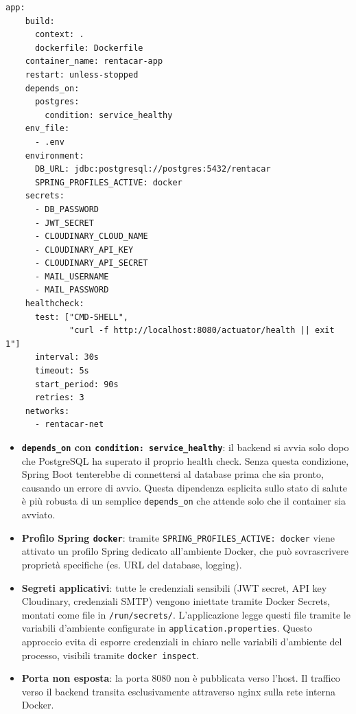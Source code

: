 \documentclass[12pt, a4paper]{article}
\begin{document}
    \begin{lstlisting}[language={}, caption={docker-compose.yml — servizio app}]
  app:
    build:
      context: .
      dockerfile: Dockerfile
    container_name: rentacar-app
    restart: unless-stopped
    depends_on:
      postgres:
        condition: service_healthy
    env_file:
      - .env
    environment:
      DB_URL: jdbc:postgresql://postgres:5432/rentacar
      SPRING_PROFILES_ACTIVE: docker
    secrets:
      - DB_PASSWORD
      - JWT_SECRET
      - CLOUDINARY_CLOUD_NAME
      - CLOUDINARY_API_KEY
      - CLOUDINARY_API_SECRET
      - MAIL_USERNAME
      - MAIL_PASSWORD
    healthcheck:
      test: ["CMD-SHELL",
             "curl -f http://localhost:8080/actuator/health || exit 1"]
      interval: 30s
      timeout: 5s
      start_period: 90s
      retries: 3
    networks:
      - rentacar-net
    \end{lstlisting}

    \begin{itemize}
        \item \textbf{\texttt{depends\_on} con \texttt{condition: service\_healthy}}: il
        backend si avvia solo dopo che PostgreSQL ha superato il proprio health check.
        Senza questa condizione, Spring Boot tenterebbe di connettersi al database prima
        che sia pronto, causando un errore di avvio. Questa dipendenza esplicita sullo stato
        di salute è più robusta di un semplice \texttt{depends\_on} che attende solo che
        il container sia avviato.

        \item \textbf{Profilo Spring \texttt{docker}}: tramite \texttt{SPRING\_PROFILES\_ACTIVE: docker}
        viene attivato un profilo Spring dedicato all'ambiente Docker, che può sovrascrivere
        proprietà specifiche (es. URL del database, logging).

        \item \textbf{Segreti applicativi}: tutte le credenziali sensibili (JWT secret,
        API key Cloudinary, credenziali SMTP) vengono iniettate tramite Docker Secrets,
        montati come file in \texttt{/run/secrets/}. L'applicazione legge questi file
        tramite le variabili d'ambiente configurate in \texttt{application.properties}.
        Questo approccio evita di esporre credenziali in chiaro nelle variabili d'ambiente
        del processo, visibili tramite \texttt{docker inspect}.

        \item \textbf{Porta non esposta}: la porta 8080 non è pubblicata verso l'host.
        Il traffico verso il backend transita esclusivamente attraverso nginx sulla rete
        interna Docker.
    \end{itemize}
\end{document}
